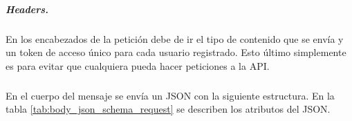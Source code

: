 \subparagraph{Headers.}
\label{\detokenize{chapter_two/desc_cloudnao:headers}}
En los encabezados de la petición debe de ir el tipo de contenido que se envía
y un token de acceso único para cada usuario registrado. Esto último
simplemente es para evitar que cualquiera pueda hacer peticiones a la API.

\begin{sphinxVerbatim}[commandchars=\\\{\}]
 
 
\end{sphinxVerbatim}


\subparagraph{}
\label{\detokenize{chapter_two/desc_cloudnao:body}}
En el cuerpo del mensaje se envía un JSON con la siguiente estructura. En la tabla 
\ref{tab:body_json_schema_request} se describen los atributos del JSON.

\begin{sphinxVerbatim}[commandchars=\\\{\}]
   
   
   \PYG{p}{[}
       
       
  \PYG{p}{]}
\end{sphinxVerbatim}


